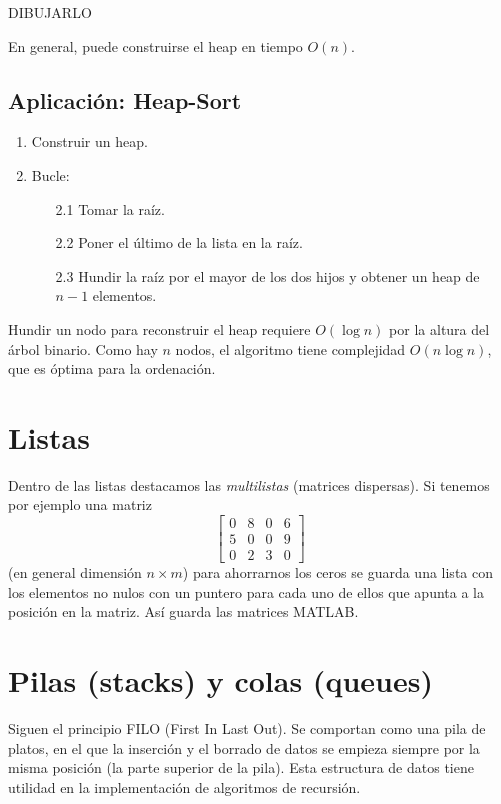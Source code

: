\documentclass[AL.tex]{subfiles}
\begin{document}
DIBUJARLO

En general, puede construirse el heap en tiempo $O(n)$. 

\subsection{Aplicación: Heap-Sort}

\begin{enumerate}
\item Construir un heap.
\item Bucle: 
\begin{itemize}
\item[2.1] Tomar la raíz.
\item[2.2] Poner el último de la lista en la raíz.
\item[2.3] Hundir la raíz por el mayor de los dos hijos y obtener un heap de $n-1$ elementos. 
\end{itemize}
\end{enumerate}
Hundir un nodo para reconstruir el heap requiere $O(\log n)$ por la altura del árbol binario. Como hay $n$ nodos, el algoritmo tiene complejidad $O(n\log n)$, que es óptima para la ordenación. 





\section{Listas}

Dentro de las listas destacamos las \emph{multilistas} (matrices dispersas). Si tenemos por ejemplo una matriz $$\begin{bmatrix}
0 & 8 & 0 & 6\\
5 & 0 & 0 & 9\\
0 & 2 & 3 & 0
\end{bmatrix}$$
(en general dimensión $n\times m$) para ahorrarnos los ceros se guarda una lista con los elementos no nulos con un puntero para cada uno de ellos que apunta a la posición en la matriz. Así guarda las matrices MATLAB. 



\section{Pilas (stacks) y colas (queues)}
Siguen el principio FILO (First In Last Out). Se comportan como una pila de platos, en el que la inserción y el borrado de datos se empieza siempre por la misma posición (la parte superior de la pila). Esta estructura de datos tiene utilidad en la implementación de algoritmos de recursión.
\end{document}
